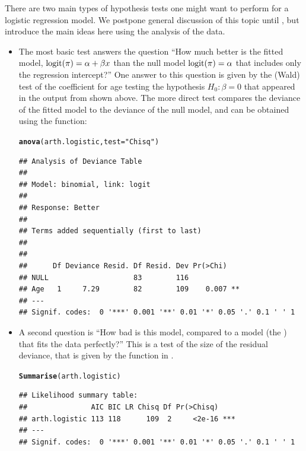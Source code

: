 \documentclass[11pt]{book}\usepackage[]{graphicx}\usepackage[]{color}
\makeatletter
\newcommand{\hlstr}[1]{\textcolor[rgb]{0.192,0.494,0.8}{#1}}%
\newcommand{\hlstd}[1]{\textcolor[rgb]{0.345,0.345,0.345}{#1}}%
\newcommand{\hlkwc}[1]{\textcolor[rgb]{0.333,0.667,0.333}{#1}}%
\newcommand{\hlkwd}[1]{\textcolor[rgb]{0.737,0.353,0.396}{\textbf{#1}}}%
\newenvironment{kframe}{%
 \def\at@end@of@kframe{}%
 \ifinner\ifhmode%
  \def\at@end@of@kframe{\end{minipage}}%
  \begin{minipage}{\columnwidth}%
 \fi\fi%
 \def\FrameCommand##1{\hskip\@totalleftmargin \hskip-\fboxsep
 \colorbox{shadecolor}{##1}\hskip-\fboxsep
     \hskip-\linewidth \hskip-\@totalleftmargin \hskip\columnwidth}%
 \MakeFramed {\advance\hsize-\width
   \@totalleftmargin\z@ \linewidth\hsize
   \@setminipage}}%
 {\par\unskip\endMakeFramed%
 \at@end@of@kframe}
\newenvironment{knitrout}{}{} %
\renewenvironment{knitrout}{\small\renewcommand{\baselinestretch}{.85}}{} %
\makeatother
\begin{document}
There are two main types of hypothesis tests one might want to perform for a
logistic regression model. We postpone general discussion of this
topic until , but introduce the main ideas here
using the analysis of the  data.
\begin{itemize}
  \item The most basic test answers the
question ``How much better is the fitted model, $\logit(\pi) = \alpha + \beta x$
than the null model $\logit(\pi) = \alpha$ that includes only the
regression intercept?'' One answer to this question is given by the
(Wald) test of the coefficient for age testing the hypothesis $H_0: \beta = 0$
that appeared in the output from
 shown above. 
The more direct test compares the deviance of the fitted model to the deviance
of the null model, and can be obtained using the  function:


\begin{knitrout}
\color{fgcolor}\begin{kframe}
\begin{alltt}
\hlkwd{anova}\hlstd{(arth.logistic,} \hlkwc{test}\hlstd{=}\hlstr{"Chisq"}\hlstd{)}
\end{alltt}
\begin{verbatim}
## Analysis of Deviance Table
## 
## Model: binomial, link: logit
## 
## Response: Better
## 
## Terms added sequentially (first to last)
## 
## 
##      Df Deviance Resid. Df Resid. Dev Pr(>Chi)   
## NULL                    83        116            
## Age   1     7.29        82        109    0.007 **
## ---
## Signif. codes:  0 '***' 0.001 '**' 0.01 '*' 0.05 '.' 0.1 ' ' 1
\end{verbatim}
\end{kframe}
\end{knitrout}

  \item A second question is ``How bad is this model, compared to a model
  (the ) that fits the data perfectly?''  This is a test
  of the size of the residual deviance, that is given by the function
   in .
\begin{knitrout}
\color{fgcolor}\begin{kframe}
\begin{alltt}
\hlkwd{Summarise}\hlstd{(arth.logistic)}
\end{alltt}
\begin{verbatim}
## Likelihood summary table:
##               AIC BIC LR Chisq Df Pr(>Chisq)    
## arth.logistic 113 118      109  2     <2e-16 ***
## ---
## Signif. codes:  0 '***' 0.001 '**' 0.01 '*' 0.05 '.' 0.1 ' ' 1
\end{verbatim}
\end{kframe}
\end{knitrout}


\end{itemize}
\end{document}

